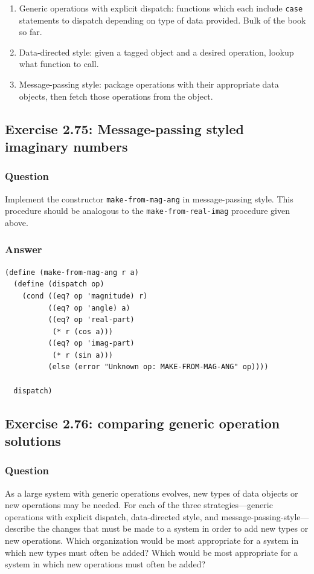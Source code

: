 \documentclass[final,fleqn,titlepage,twoside]{article}
\begin{document}
\begin{enumerate}
\item Generic operations with explicit dispatch: functions which each include
\texttt{case} statements to dispatch depending on type of data provided.
Bulk of the book so far.
\item Data-directed style: given a tagged object and a desired operation, lookup
what function to call.
\item Message-passing style: package operations with their appropriate data
objects, then fetch those operations from the object.
\end{enumerate}

\subsection{Exercise 2.75: Message-passing styled imaginary numbers}
\label{sec:org21a5fd5}
\subsubsection{Question}
\label{sec:org8e2fa24}
Implement the constructor \texttt{make-from-mag-ang} in message-passing
style. This procedure should be analogous to the \texttt{make-from-real-imag}
procedure given above.

\subsubsection{Answer}
\label{sec:org1611753}
\begin{verbatim}
(define (make-from-mag-ang r a)
  (define (dispatch op)
    (cond ((eq? op 'magnitude) r)
          ((eq? op 'angle) a)
          ((eq? op 'real-part)
           (* r (cos a)))
          ((eq? op 'imag-part)
           (* r (sin a)))
          (else (error "Unknown op: MAKE-FROM-MAG-ANG" op))))

  dispatch)
\end{verbatim}

\subsection{Exercise 2.76: comparing generic operation solutions}
\label{sec:orgedf0b95}
\subsubsection{Question}
\label{sec:org1684f8e}
As a large system with generic operations evolves, new types of data objects or
new operations may be needed. For each of the three strategies---generic
operations with explicit dispatch, data-directed style, and
message-passing-style---describe the changes that must be made to a system in
order to add new types or new operations. Which organization would be most
appropriate for a system in which new types must often be added? Which would be
most appropriate for a system in which new operations must often be added?
\end{document}
